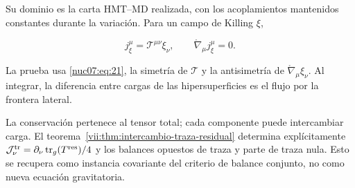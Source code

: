 Su dominio es la carta HMT–MD realizada, con los acoplamientos mantenidos constantes durante la variación. Para un campo de Killing \(\xi\),

\begin{equation}
j^\mu_\xi=\mathcal T^{\mu\nu}\xi_\nu,\qquad
\mathring\nabla_\mu j^\mu_\xi=0.
\label{nuc07:eq:22}
\end{equation}

La prueba usa \eqref{nuc07:eq:21}, la simetría de \(\mathcal T\) y la antisimetría de \(\mathring\nabla_\mu\xi_\nu\). Al integrar, la diferencia entre cargas de las hipersuperficies es el flujo por la frontera lateral.

La conservación pertenece al tensor total; cada componente puede intercambiar carga. El teorema~\ref{vii:thm:intercambio-traza-residual} determina explícitamente \(\mathcal J^{\rm tr}_\nu=\partial_\nu\operatorname{tr}_g(T^{\rm res})/4\) y los balances opuestos de traza y parte de traza nula. Esto se recupera como instancia covariante del criterio de balance conjunto, no como nueva ecuación gravitatoria.
